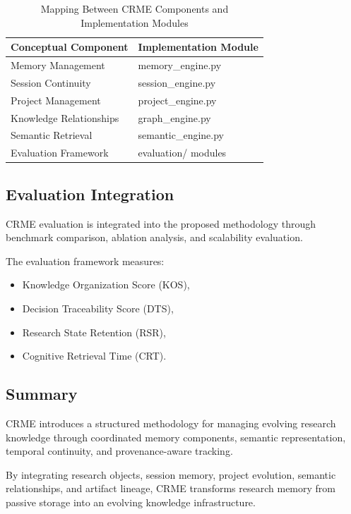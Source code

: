 \begin{table}[h]
\centering
\caption{Mapping Between CRME Components and Implementation Modules}
\label{tab:implementation_mapping}

\begin{tabular}{ll}
\hline
Conceptual Component & Implementation Module\\
\hline
Memory Management & memory\_engine.py\\
Session Continuity & session\_engine.py\\
Project Management & project\_engine.py\\
Knowledge Relationships & graph\_engine.py\\
Semantic Retrieval & semantic\_engine.py\\
Evaluation Framework & evaluation/ modules\\
\hline
\end{tabular}

\end{table}


\subsection{Evaluation Integration}

CRME evaluation is integrated into the proposed methodology through benchmark comparison, ablation analysis, and scalability evaluation.

The evaluation framework measures:

\begin{itemize}
\item Knowledge Organization Score (KOS),
\item Decision Traceability Score (DTS),
\item Research State Retention (RSR),
\item Cognitive Retrieval Time (CRT).
\end{itemize}


\subsection{Summary}

CRME introduces a structured methodology for managing evolving research knowledge through coordinated memory components, semantic representation, temporal continuity, and provenance-aware tracking.

By integrating research objects, session memory, project evolution, semantic relationships, and artifact lineage, CRME transforms research memory from passive storage into an evolving knowledge infrastructure.

